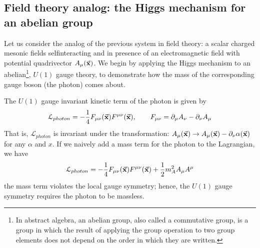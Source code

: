 \documentclass[../../Main/Main.tex]{subfiles}
\begin{document}
\subsection{Field theory analog: the Higgs mechanism for an abelian group}
Let us consider the analog of the previous system in field theory: a scalar charged mesonic fields selfinteracting and in presence of an electromagnetic field with potential quadrivector \( A_ \mu  ( \va{x}) \). We begin by applying the Higgs mechanism to an abelian\footnote{In abstract algebra, an abelian group, also called a commutative group, is a group in which the result of applying the group operation to two group elements does not depend on the order in which they are written.}, \( U(1) \)  gauge theory, to demonstrate how the mass of the corresponding gauge boson (the photon) comes about.

The \( U(1) \) gauge invariant kinetic term of the photon is given by
\begin{equation*}
  \mathcal{L}_{photon} = - \frac{1}{4} F_ {\mu  \nu } (\va{x}) F ^{ \mu \nu } (\va{x}), \qquad F_ { \mu \nu } = \partial_ \mu  A _ \nu  - \partial _ \nu  A _ \mu
\end{equation*}
That is, \( \mathcal{L}_{photon}  \)  is invariant under the transformation: \( A_\mu (\va{x}) \rightarrow A_\mu (\va{x}) - \partial_ \nu \alpha  (\va{x})  \) for any \( \alpha  \) and \( x \).
If we naively add a mass term for the photon to the Lagrangian, we have
\begin{equation*}
    \mathcal{L}_{photon} = - \frac{1}{4} F_ {\mu  \nu } (\va{x}) F ^{ \mu \nu } (\va{x}) + \frac{1}{2} m_A^2 A_\mu A^\mu
\end{equation*}
 the mass term violates the local gauge symmetry; hence, the \( U(1) \)  gauge symmetry requires the photon to be massless.
\end{document}
